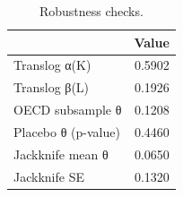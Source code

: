 \begin{table}[t]
\centering\small
\begin{tabular}{lr}
\toprule
 & Value \\
\midrule
Translog α(K) & 0.5902 \\
Translog β(L) & 0.1926 \\
OECD subsample θ & 0.1208 \\
Placebo θ (p-value) & 0.4460 \\
Jackknife mean θ & 0.0650 \\
Jackknife SE & 0.1320 \\
\bottomrule
\end{tabular}
\caption{Robustness checks.}
\label{tab:robust}
\end{table}
